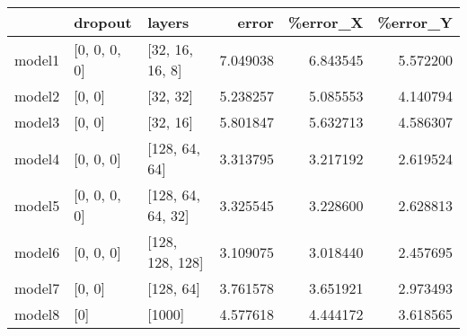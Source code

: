 \begin{tabular}{lllrrr}
\toprule
{} &       dropout &             layers &     error &  \%error\_X &  \%error\_Y \\
\midrule
model1 &  [0, 0, 0, 0] &    [32, 16, 16, 8] &  7.049038 &  6.843545 &  5.572200 \\
model2 &        [0, 0] &           [32, 32] &  5.238257 &  5.085553 &  4.140794 \\
model3 &        [0, 0] &           [32, 16] &  5.801847 &  5.632713 &  4.586307 \\
model4 &     [0, 0, 0] &      [128, 64, 64] &  3.313795 &  3.217192 &  2.619524 \\
model5 &  [0, 0, 0, 0] &  [128, 64, 64, 32] &  3.325545 &  3.228600 &  2.628813 \\
model6 &     [0, 0, 0] &    [128, 128, 128] &  3.109075 &  3.018440 &  2.457695 \\
model7 &        [0, 0] &          [128, 64] &  3.761578 &  3.651921 &  2.973493 \\
model8 &           [0] &             [1000] &  4.577618 &  4.444172 &  3.618565 \\
\bottomrule
\end{tabular}
